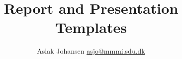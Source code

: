 \title{Report and Presentation Templates}
\author{Aslak Johansen \href{mailto:asjo@mmmi.sdu.dk}{asjo@mmmi.sdu.dk}}

